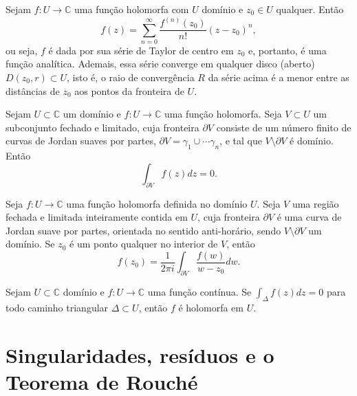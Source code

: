 \begin{teorema}
Sejam $f:U\to\mathbb{C}$ uma função holomorfa com $U$ domínio e $z_0\in U$ qualquer.
Então
\begin{equation*}
    f(z) = \sum_{n=0}^{\infty} \frac{f^{(n)}(z_0)}{n!}(z-z_0)^n,
\end{equation*}
ou seja, $f$ é dada por sua série de Taylor de centro em $z_0$ e, portanto, é uma função analítica.
Ademais, essa série converge em qualquer disco (aberto) $D(z_0, r) \subset U$, isto é, o raio de convergência $R$ da série acima é a menor entre as distâncias de $z_0$ aos pontos da fronteira de $U$.
\end{teorema}


\begin{teorema}
\label{teo-cauchy}
Sejam $U\subset\mathbb{C}$ um domínio e $f:U\to\mathbb{C}$ uma função holomorfa. Seja $V\subset U$ um subconjunto fechado e limitado, cuja fronteira $\partial V$ consiste de um número finito de curvas de Jordan
suaves por partes, $\partial V = \gamma_1\cup\cdots\gamma_n$, e tal que
$V\setminus\partial V$ é domínio. Então
\begin{equation*}
    \int_{\partial V} f(z) dz = 0.
\end{equation*}
\end{teorema}

\begin{teorema}
Seja $f:U\to\mathbb{C}$ uma função holomorfa definida no domínio $U$. Seja $V$ uma região fechada e limitada inteiramente contida em $U$, 
cuja fronteira $\partial V$ é uma curva de Jordan suave por partes, orientada no sentido anti-horário, sendo $V\setminus\partial V$ um domínio.
Se $z_0$ é um ponto qualquer no interior de $V$, então
\begin{equation*}
    f(z_0) = \frac{1}{2\pi i}\int_{\partial V} \frac{f(w)}{w-z_0} dw.
\end{equation*}
\end{teorema}


\begin{teorema}
\label{teo-morera}
Sejam $U\subset\mathbb{C}$ domínio e $f:U\to\mathbb{C}$ uma função contínua.
Se $\int_{\Delta} f(z) dz = 0$ para todo caminho triangular $\Delta\subset U$, então $f$ é holomorfa em $U$.
\end{teorema}


\section[Singularidades, resíduos e o Teorema de Rouché]{Singularidades, resíduos e o Teorema de Rouché}

